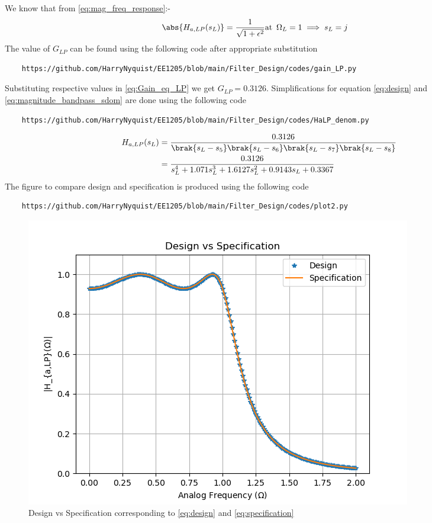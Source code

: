 \documentclass{article}
\begin{document}
\begin{enumerate}
We know that from \eqref{eq:mag_freq_response}:-
\begin{align}
    \abs{ H_{a,LP}(s_L)} &= \frac{1}{\sqrt{1+\epsilon^2}} \text{at} \hspace{5pt} \Omega_{L}=1 \implies s_{L} = j \label{eq:Gain_eq_LP} 
\end{align}
The value of $G_{LP}$ can be found using the following code after appropriate substitution
\begin{lstlisting}
    https://github.com/HarryNyquist/EE1205/blob/main/Filter_Design/codes/gain_LP.py
\end{lstlisting}
Substituting respective values in \eqref{eq:Gain_eq_LP} we get $G_{LP}=0.3126$.
Simplifications for equation \eqref{eq:design} and \eqref{eq:magnitude_bandpass_sdom} are done using the following code
\begin{lstlisting}
    https://github.com/HarryNyquist/EE1205/blob/main/Filter_Design/codes/HaLP_denom.py
\end{lstlisting}
\begin{align}
     H_{a,LP}(s_L) &= \frac{0.3126}{\brak{s_L-s_5}\brak{s_L-s_6}\brak{s_L-s_7}\brak{s_L-s_8}}\\
     &= \frac{0.3126}{s_{L}^4 + 1.071s_{L}^3 +1.6127s_{L}^2 + 0.9143s_{L} +0.3367}\label{eq:design}
\end{align}
The figure to compare design and specification is produced using the following code
\begin{lstlisting}
    https://github.com/HarryNyquist/EE1205/blob/main/Filter_Design/codes/plot2.py
\end{lstlisting}
\begin{figure}[H]
\centering
\includegraphics[width=1\columnwidth]{figs/Design_vs_Specification.png}
\caption{Design vs Specification corresponding to \eqref{eq:design} and \eqref{eq:specification}}
\label{fig:design_vs_specf}
\end{figure}


\end{enumerate}
\end{document}
